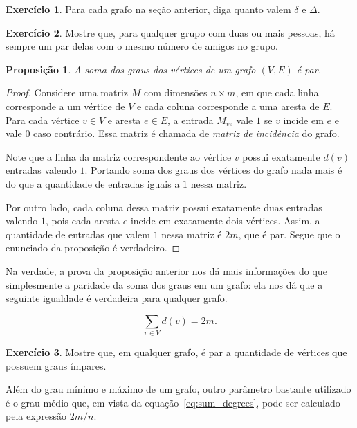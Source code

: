 \documentclass[12pt, a4paper]{article}
\newtheorem{prop}[teor]{Proposição}
\theoremstyle{definition}
\newtheorem{exer}{Exercício}
\begin{document}
\begin{exer}
Para cada grafo na seção anterior, diga quanto valem $\delta$ e $\Delta$.
\end{exer}

\begin{exer}
Mostre que, para qualquer grupo com duas ou mais pessoas, há sempre um par delas com o mesmo número de amigos no grupo.
\end{exer}

\begin{prop}
\label{prop:parity_sum_degrees}
A soma dos graus dos vértices de um grafo $(V,E)$ é par.
\end{prop}

\begin{proof}
Considere uma matriz $M$ com dimensões $n \times m$, em que cada linha corresponde a um vértice de $V$ e cada coluna corresponde a uma aresta de $E$. Para cada vértice $v \in V$ e aresta $e \in E$, a entrada $M_{ve}$ vale $1$ se $v$ incide em $e$ e vale $0$ caso contrário. Essa matriz é chamada de \emph{matriz de incidência} do grafo. 

Note que a linha da matriz correspondente ao vértice $v$ possui exatamente $d(v)$ entradas valendo $1$. Portando soma dos graus dos vértices do grafo nada mais é do que a quantidade de entradas iguais a $1$ nessa matriz. 

Por outro lado, cada coluna dessa matriz possui exatamente duas entradas valendo $1$, pois cada aresta $e$ incide em exatamente dois vértices. Assim, a quantidade de entradas que valem $1$ nessa matriz é $2m$, que é par. Segue que o enunciado da proposição é verdadeiro.
\end{proof}

\noindent Na verdade, a prova da proposição anterior nos dá mais informações do que simplesmente a paridade da soma dos graus em um grafo: ela nos dá que a seguinte igualdade é verdadeira para qualquer grafo.

\begin{equation}
    \label{eq:sum_degrees}
    \sum_{v \in V} d(v) = 2m. 
\end{equation} 

\begin{exer}
Mostre que, em qualquer grafo, é par a quantidade de vértices que possuem graus ímpares.
\end{exer}

\noindent Além do grau mínimo e máximo de um grafo, outro parâmetro bastante utilizado é o grau médio que, em vista da equação~\eqref{eq:sum_degrees}, pode ser calculado pela expressão $2m/n$.
\end{document}
